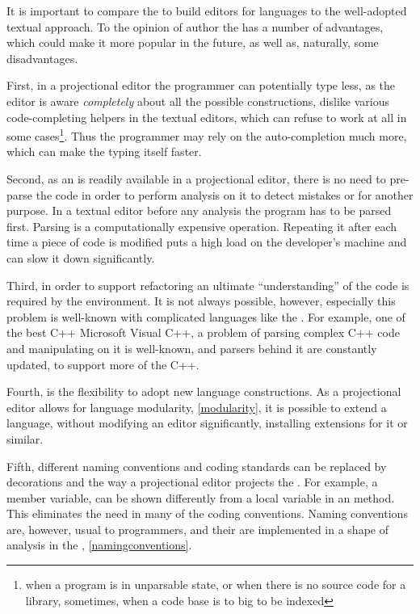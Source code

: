 



  It is important to compare the  to build editors for languages to the well-adopted 
  textual approach. To the opinion of author the  has a number of advantages, 
  which could make it more popular in the future, as well as, naturally, some disadvantages.
  
  First, in a projectional editor the programmer can potentially type less, as the editor is aware \emph{completely}
  about all the possible constructions, dislike various code-completing helpers in the textual editors, which can refuse 
  to work at all in some cases\footnote{when a program is in unparsable state, or when there is no source code for a library,
  sometimes, when a code base is to big to be indexed}. Thus the programmer may rely on the auto-completion much more, which
  can make the typing itself faster.

  Second, as an  is readily available  in a projectional editor, there is no need to pre-parse the code in order to 
  perform analysis on it to detect mistakes or for another purpose. In a textual editor before any analysis the program has to be 
  parsed first. Parsing is a computationally expensive operation. Repeating it after each time a piece of code is modified 
  puts a high load on the developer's machine and can slow it down significantly. 

  Third, in order to support refactoring an ultimate ``understanding'' of the code is required by the environment. 
  It is not always possible, however, especially this problem is well-known with complicated languages like the \cpppl.
  For example, one of the best C++  Microsoft Visual C++, a problem of parsing complex C++ code and manipulating 
  on it is well-known, and parsers behind it are constantly updated, to support more of the C++.
    
  
  Fourth, is the flexibility to adopt new language constructions. 
  As a projectional editor allows for language modularity, \ref{modularity}, it is possible to extend a language, 
  without modifying an editor significantly, installing extensions for it or similar.
  
  Fifth, different naming conventions and coding standards can be replaced by decorations and the way a projectional editor
  projects the . For example, a member variable, can be shown differently from a local variable in an method. This 
  eliminates the need in many of the coding conventions. Naming conventions are, however, usual to programmers, and their are
  implemented in a shape of analysis in the \pcpp, \ref{namingconventions}.

